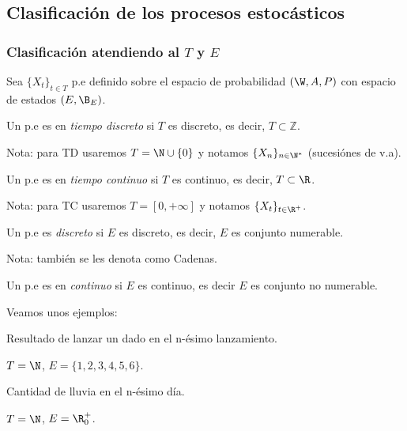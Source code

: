 \subsection{Clasificación de los procesos estocásticos}

\subsubsection{Clasificación atendiendo al $T$ y $E$}
Sea $\{X_t\}_{t \in T}$ p.e definido sobre el espacio de probabilidad $(\W, A, P)$ con espacio de estados $(E, \B_E)$.

\begin{ndef}
  Un p.e es en \emph{tiempo discreto} si $T$ es discreto, es decir, $T \subset \mathbb{Z}$.
\end{ndef}

Nota: para TD usaremos $T = \N \cup \{ 0 \}$ y notamos $\{X_n\}_{n \in \N^*}$ (sucesiónes de v.a).

\begin{ndef}
  Un p.e es en \emph{tiempo continuo} si $T$ es continuo, es decir, $T \subset \R$.
\end{ndef}

Nota: para TC usaremos $T = [0, +\infty]$ y notamos $\{X_t\}_{t \in \R^+}$.

\begin{ndef}
  Un p.e es \emph{discreto} si $E$ es discreto, es decir, $E$ es conjunto numerable.
\end{ndef}

Nota: también se les denota como Cadenas.

\begin{ndef}
  Un p.e es en \emph{continuo} si $E$ es continuo, es decir $E$ es conjunto no numerable.
\end{ndef}

Veamos unos ejemplos:

\begin{ejemplo}[PDTD]
  Resultado de lanzar un dado en el n-ésimo lanzamiento.

  $T = \N$, $E = \{1,2,3,4,5,6\}$.
\end{ejemplo}

\begin{ejemplo}[PCTD]
  Cantidad de lluvia en el n-ésimo día.

  $T = \N$, $E = \R^+_0$.
\end{ejemplo}

